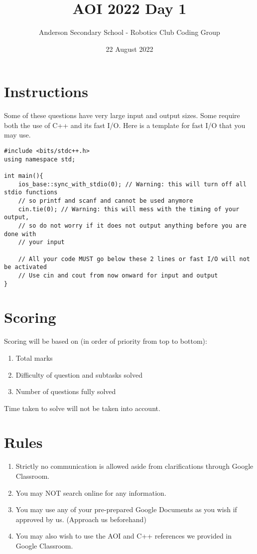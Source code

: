 \documentclass{report}
\title{AOI 2022 Day 1}
\author{Anderson Secondary School - Robotics Club Coding Group}
\date{22 August 2022}
\begin{document}
\setlength{\parindent}{0pt}

\maketitle

\hfill \break \hfill \break

\section*{Instructions}
Some of these questions have very large input and output sizes. Some require both the use of C++ and its fast I/O. Here is a template for fast I/O that you may use.

\begin{verbatim}
#include <bits/stdc++.h>
using namespace std;

int main(){
    ios_base::sync_with_stdio(0); // Warning: this will turn off all stdio functions
    // so printf and scanf and cannot be used anymore
    cin.tie(0); // Warning: this will mess with the timing of your output, 
    // so do not worry if it does not output anything before you are done with
    // your input
    
    // All your code MUST go below these 2 lines or fast I/O will not be activated
    // Use cin and cout from now onward for input and output
}
\end{verbatim}

\section*{Scoring}
Scoring will be based on (in order of priority from top to bottom):
\begin{enumerate}
    \item Total marks
    \item Difficulty of question and subtasks solved
    \item Number of questions fully solved
\end{enumerate}

Time taken to solve will not be taken into account.

\section*{Rules}
\begin{enumerate}
    \item Strictly no communication is allowed aside from clarifications through Google Classroom.
    \item You may NOT search online for any information.
    \item You may use any of your pre-prepared Google Documents as you wish if approved by us. (Approach us beforehand)
    \item You may also wish to use the AOI and C++ references we provided in Google Classroom.
\end{enumerate}
\end{document}
